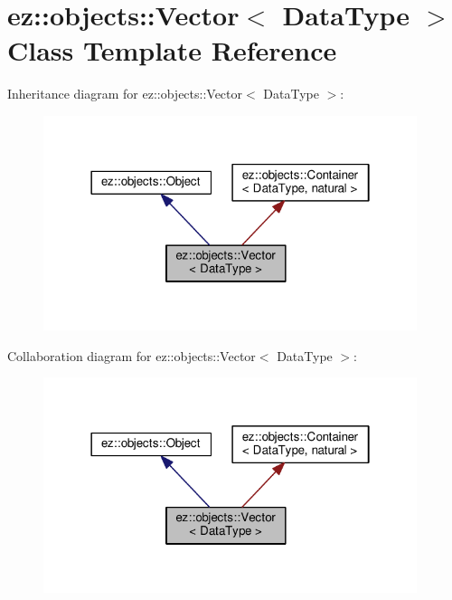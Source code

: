 \hypertarget{classez_1_1objects_1_1Vector}{}\section{ez\+:\+:objects\+:\+:Vector$<$ Data\+Type $>$ Class Template Reference}
\label{classez_1_1objects_1_1Vector}


Inheritance diagram for ez\+:\+:objects\+:\+:Vector$<$ Data\+Type $>$\+:
\nopagebreak
\begin{figure}[H]
\begin{center}
\leavevmode
\includegraphics[width=310pt]{classez_1_1objects_1_1Vector__inherit__graph}
\end{center}
\end{figure}


Collaboration diagram for ez\+:\+:objects\+:\+:Vector$<$ Data\+Type $>$\+:
\nopagebreak
\begin{figure}[H]
\begin{center}
\leavevmode
\includegraphics[width=310pt]{classez_1_1objects_1_1Vector__coll__graph}
\end{center}
\end{figure}
